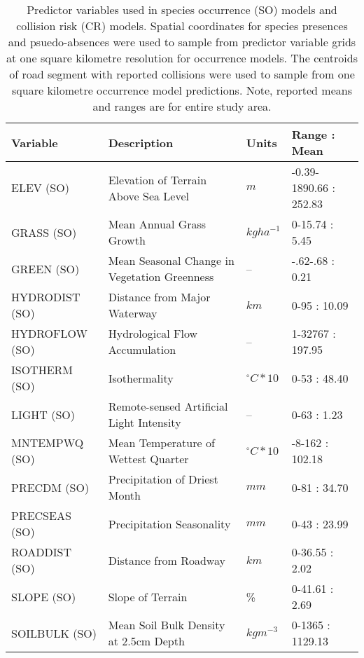 \begin{table}[htp]
\caption[Predictor variables used in species occurrence models and collision risk models]{Predictor variables used in species occurrence (SO) models and collision risk (CR) models. Spatial coordinates for species presences and psuedo-absences were used to sample from predictor variable grids at one square kilometre resolution for occurrence models. The centroids of road segment with reported collisions were used to sample from one square kilometre occurrence model predictions. Note, reported means and ranges are for entire study area.}
\begin{tabularx}{\textwidth}{lYll} \toprule
Variable       &Description                                               &Units          &Range : Mean\\
\midrule 
ELEV (SO)       &Elevation of Terrain Above Sea Level                     &$m$			  &-0.39-1890.66 : 252.83\\
GRASS (SO)      &Mean Annual Grass Growth					              &$kg ha^{-1}$   &0-15.74 : 5.45\\
GREEN (SO)      &Mean Seasonal Change in Vegetation Greenness             &--             &-.62-.68 : 0.21\\
HYDRODIST (SO)  &Distance from Major Waterway                             &$km$           &0-95 : 10.09\\
HYDROFLOW (SO)  &Hydrological Flow Accumulation                           &--             &1-32767 : 197.95\\
ISOTHERM (SO)   &Isothermality                                            &$^{\circ}C*10$ &0-53 : 48.40\\
LIGHT (SO)      &Remote-sensed Artificial Light Intensity                 &--             &0-63 : 1.23\\
MNTEMPWQ (SO)   &Mean Temperature of Wettest Quarter                      &$^{\circ}C*10$ &-8-162 : 102.18\\
PRECDM (SO)     &Precipitation of Driest Month                            &$mm$           &0-81 : 34.70\\
PRECSEAS (SO)   &Precipitation Seasonality                                &$mm$           &0-43 : 23.99\\
ROADDIST (SO)   &Distance from Roadway                                    &$km$           &0-36.55 : 2.02\\
SLOPE (SO)      &Slope of Terrain                                         &\%             &0-41.61 : 2.69\\
SOILBULK (SO)   &Mean Soil Bulk Density at 2.5cm Depth                    &$kg m^{-3}$       &0-1365 : 1129.13\\

\end{tabularx}
\end{table}
